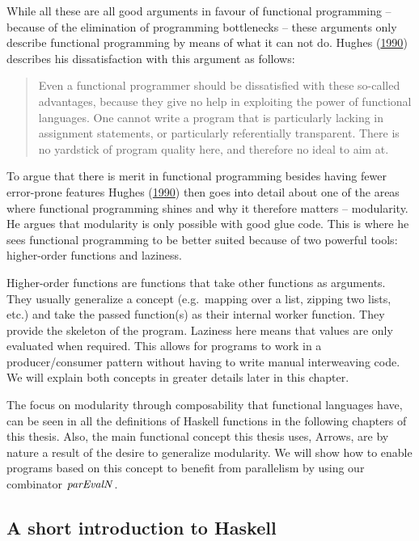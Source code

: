 \documentclass[paper=A4,twoside=true,openright,parskip=full,chapterprefix=true,headings=normal,bibliography=totoc,listof=totoc,titlepage=on,captions=tableabove,draft=false,british]{scrreprt}%
\begin{document}
While all these are all good arguments in favour of functional
programming -- because of the elimination of programming bottlenecks --
these arguments only describe functional programming by means of what it
can not do. Hughes
(\protect\hyperlink{ref-Hughes:1990:WFP:119830.119832}{1990}) describes
his dissatisfaction with this argument as follows:

\begin{quote}
Even a functional programmer should be dissatisfied with these so-called
advantages, because they give no help in exploiting the power of
functional languages. One cannot write a program that is particularly
lacking in assignment statements, or particularly referentially
transparent. There is no yardstick of program quality here, and
therefore no ideal to aim at.
\end{quote}

To argue that there is merit in functional programming besides having
fewer error-prone features Hughes
(\protect\hyperlink{ref-Hughes:1990:WFP:119830.119832}{1990}) then goes
into detail about one of the areas where functional programming shines
and why it therefore matters -- modularity. He argues that modularity is
only possible with good glue code. This is where he sees functional
programming to be better suited because of two powerful tools:
higher-order functions and laziness.

Higher-order functions are functions that take other functions as
arguments. They usually generalize a concept (e.g.~mapping over a list,
zipping two lists, etc.) and take the passed function(s) as their
internal worker function. They provide the skeleton of the program.
Laziness here means that values are only evaluated when required. This
allows for programs to work in a producer/consumer pattern without
having to write manual interweaving code. We will explain both concepts
in greater details later in this chapter.

The focus on modularity through composability that functional languages
have, can be seen in all the definitions of Haskell functions in the
following chapters of this thesis. Also, the main functional concept
this thesis uses, Arrows, are by nature a result of the desire to
generalize modularity. We will show how to enable programs based on this
concept to benefit from parallelism by using our combinator \ensuremath{\Varid{parEvalN}}.

\hypertarget{a-short-introduction-to-haskell}{%
\subsection{A short introduction to
Haskell}\label{a-short-introduction-to-haskell}}
\end{document}
